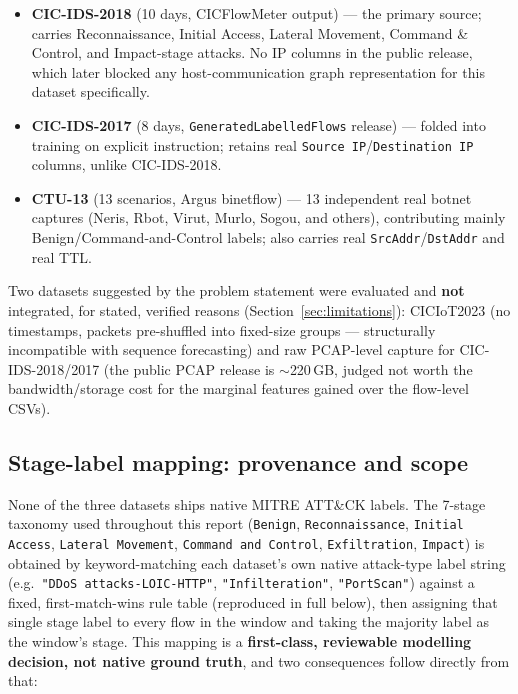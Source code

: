 \documentclass[11pt]{article}
\newcommand{\code}[1]{\texttt{#1}}
\begin{document}
\begin{itemize}[leftmargin=1.5em]
  \item \textbf{CIC-IDS-2018} (10 days, CICFlowMeter output) --- the primary source; carries
  Reconnaissance, Initial Access, Lateral Movement, Command \& Control, and Impact-stage
  attacks. No IP columns in the public release, which later blocked any host-communication
  graph representation for this dataset specifically.
  \item \textbf{CIC-IDS-2017} (8 days, \code{GeneratedLabelledFlows} release) --- folded into
  training on explicit instruction; retains real \code{Source IP}/\code{Destination IP} columns,
  unlike CIC-IDS-2018.
  \item \textbf{CTU-13} (13 scenarios, Argus binetflow) --- 13 independent real botnet captures
  (Neris, Rbot, Virut, Murlo, Sogou, and others), contributing mainly Benign/Command-and-Control
  labels; also carries real \code{SrcAddr}/\code{DstAddr} and real TTL.
\end{itemize}

\noindent Two datasets suggested by the problem statement were evaluated and \textbf{not}
integrated, for stated, verified reasons (Section~\ref{sec:limitations}): CICIoT2023 (no
timestamps, packets pre-shuffled into fixed-size groups --- structurally incompatible with
sequence forecasting) and raw PCAP-level capture for CIC-IDS-2018/2017 (the public PCAP release
is $\sim$220\,GB, judged not worth the bandwidth/storage cost for the marginal features gained
over the flow-level CSVs).

\subsection{Stage-label mapping: provenance and scope}
\label{sec:attackmapping}

None of the three datasets ships native MITRE ATT\&CK labels. The 7-stage taxonomy used
throughout this report (\code{Benign}, \code{Reconnaissance}, \code{Initial Access},
\code{Lateral Movement}, \code{Command and Control}, \code{Exfiltration}, \code{Impact}) is
obtained by keyword-matching each dataset's own native attack-type label string (e.g.\
\code{"DDoS attacks-LOIC-HTTP"}, \code{"Infilteration"}, \code{"PortScan"}) against a fixed,
first-match-wins rule table (reproduced in full below), then assigning that single stage label
to every flow in the window and taking the majority label as the window's stage. This mapping
is a \textbf{first-class, reviewable modelling decision, not native ground truth}, and two
consequences follow directly from that:
\end{document}
